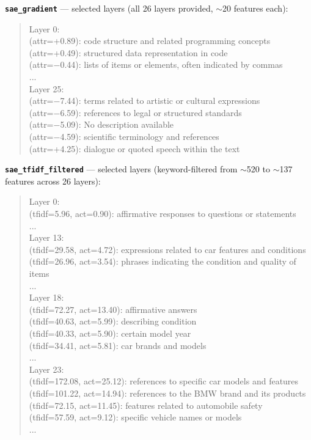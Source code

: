 \documentclass{article} %
\begin{document}
\smallskip\noindent\textbf{\texttt{sae\_gradient}} --- selected layers (all 26 layers provided, ${\sim}$20 features each):
\begin{quote}\small\ttfamily
Layer 0:\\
\quad{[16300]} (attr=+0.89): code structure and related programming concepts\\
\quad{[15889]} (attr=+0.49): structured data representation in code\\
\quad{[3148]} (attr=$-$0.44): lists of items or elements, often indicated by commas\\
\quad...\\
Layer 25:\\
\quad{[10150]} (attr=$-$7.44): terms related to artistic or cultural expressions\\
\quad{[14186]} (attr=$-$6.59): references to legal or structured standards\\
\quad{[14087]} (attr=$-$5.09): No description available\\
\quad{[6750]} (attr=$-$4.59): scientific terminology and references\\
\quad{[14800]} (attr=+4.25): dialogue or quoted speech within the text
\end{quote}

\smallskip\noindent\textbf{\texttt{sae\_tfidf\_filtered}} --- selected layers (keyword-filtered from ${\sim}$520 to ${\sim}$137 features across 26 layers):
\begin{quote}\small\ttfamily
Layer 0:\\
\quad{[10370]} (tfidf=5.96, act=0.90): affirmative responses to questions or statements\\
\quad...\\
Layer 13:\\
\quad{[2816]} (tfidf=29.58, act=4.72): \colorbox{gradrow}{expressions related to car features and conditions}\\
\quad{[15179]} (tfidf=26.96, act=3.54): \colorbox{gradrow}{phrases indicating the condition and quality of items}\\
\quad...\\
Layer 18:\\
\quad{[10124]} (tfidf=72.27, act=13.40): affirmative answers\\
\quad{[762]} (tfidf=40.63, act=5.99): \colorbox{gradrow}{describing condition}\\
\quad{[3709]} (tfidf=40.33, act=5.90): certain model year\\
\quad{[7059]} (tfidf=34.41, act=5.81): car brands and models\\
\quad...\\
Layer 23:\\
\quad{[14116]} (tfidf=172.08, act=25.12): references to specific car models and features\\
\quad{[3652]} (tfidf=101.22, act=14.94): references to the BMW brand and its products\\
\quad{[6865]} (tfidf=72.15, act=11.45): features related to automobile safety\\
\quad{[12493]} (tfidf=57.59, act=9.12): specific vehicle names or models\\
\quad...
\end{quote}
\end{document}
